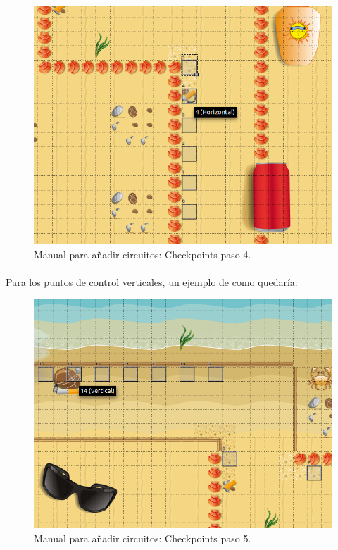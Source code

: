 \begin{figure}[H]
  \label{checkpoints4}
  \begin{center}
    \includegraphics[scale=0.5]{imagenes/manualcircuito/checkpoints4.png}
  \end{center}
  \caption{Manual para añadir circuitos: Checkpoints paso 4.}
\end{figure}

\paragraph{}
Para los puntos de control verticales, un ejemplo de como quedaría:

\begin{figure}[H]
  \label{checkpoints5}
  \begin{center}
    \includegraphics[scale=0.5]{imagenes/manualcircuito/checkpoints5.png}
  \end{center}
  \caption{Manual para añadir circuitos: Checkpoints paso 5.}
\end{figure}


